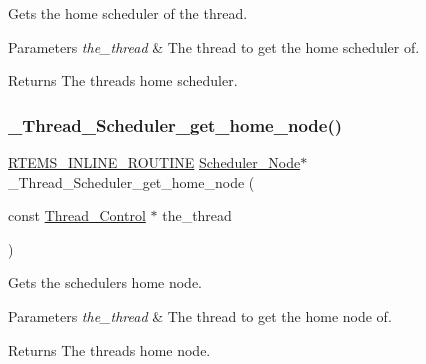 Gets the home scheduler of the thread. 


\begin{DoxyParams}{Parameters}
{\em the\+\_\+thread} & The thread to get the home scheduler of.\\
\hline
\end{DoxyParams}
\begin{DoxyReturn}{Returns}
The thread\textquotesingle{}s home scheduler. 
\end{DoxyReturn}
\mbox{\label{group__RTEMSScoreThread_ga080a177afc4fc254a1081485cd89f75d}} 
\subsubsection{\texorpdfstring{\_Thread\_Scheduler\_get\_home\_node()}{\_Thread\_Scheduler\_get\_home\_node()}}
{\footnotesize\ttfamily \mbox{\hyperlink{group__RTEMSScoreBaseDefs_gac216239df231d5dbd15e3520b0b9313f}{R\+T\+E\+M\+S\+\_\+\+I\+N\+L\+I\+N\+E\+\_\+\+R\+O\+U\+T\+I\+NE}} \mbox{\hyperlink{structScheduler__Node}{Scheduler\+\_\+\+Node}}$\ast$ \+\_\+\+Thread\+\_\+\+Scheduler\+\_\+get\+\_\+home\+\_\+node (\begin{DoxyParamCaption}\item[{const \mbox{\hyperlink{struct__Thread__Control}{Thread\+\_\+\+Control}} $\ast$}]{the\+\_\+thread }\end{DoxyParamCaption})}



Gets the scheduler\textquotesingle{}s home node. 


\begin{DoxyParams}{Parameters}
{\em the\+\_\+thread} & The thread to get the home node of.\\
\hline
\end{DoxyParams}
\begin{DoxyReturn}{Returns}
The thread\textquotesingle{}s home node. 
\end{DoxyReturn}
\mbox{\label{group__RTEMSScoreThread_ga03136c6e5b56781aeff0ace838556d67}} 
